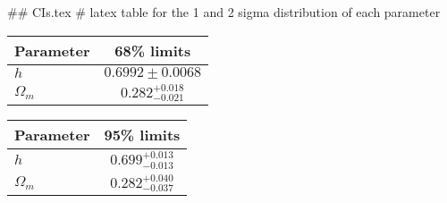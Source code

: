 ## CIs.tex
# latex table for the 1 and 2 sigma distribution of each parameter

\begin{tabular} { l  c}
 Parameter &  68\% limits\\
\hline
{\boldmath$h              $} & $0.6992\pm 0.0068          $\\
{\boldmath$\Omega_m       $} & $0.282^{+0.018}_{-0.021}   $\\
\hline
\end{tabular}

\begin{tabular} { l  c}
 Parameter &  95\% limits\\
\hline
{\boldmath$h              $} & $0.699^{+0.013}_{-0.013}   $\\
{\boldmath$\Omega_m       $} & $0.282^{+0.040}_{-0.037}   $\\
\hline
\end{tabular}

